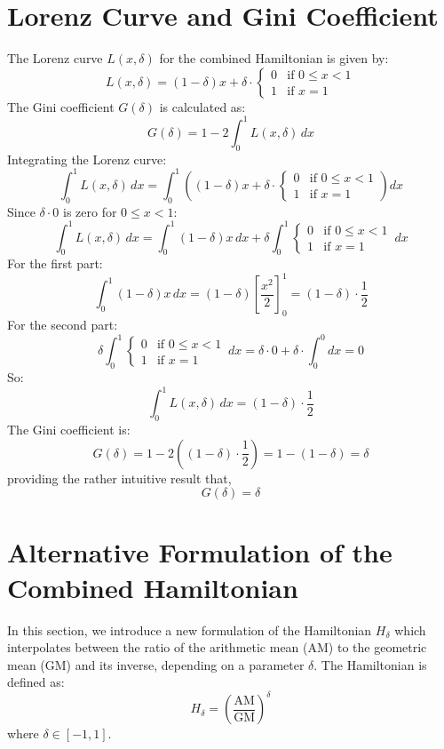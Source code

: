 \documentclass{article}
\begin{document}
\section{Lorenz Curve and Gini Coefficient}
The Lorenz curve \( L(x, \delta) \) for the combined Hamiltonian is given by:
\[
L(x, \delta) = (1 - \delta) x + \delta \cdot
\begin{cases} 
0 & \text{if } 0 \leq x < 1 \\
1 & \text{if } x = 1
\end{cases}
\]
The Gini coefficient \( G(\delta) \) is calculated as:
\[
G(\delta) = 1 - 2 \int_0^1 L(x, \delta) \, dx
\]
Integrating the Lorenz curve:
\[
\int_0^1 L(x, \delta) \, dx = \int_0^1 \left( (1 - \delta) x + \delta \cdot
\begin{cases} 
0 & \text{if } 0 \leq x < 1 \\
1 & \text{if } x = 1
\end{cases}
\right) dx
\]
Since \( \delta \cdot 0 \) is zero for \( 0 \leq x < 1 \):
\[
\int_0^1 L(x, \delta) \, dx = \int_0^1 (1 - \delta) x \, dx + \delta \int_0^1
\begin{cases} 
0 & \text{if } 0 \leq x < 1 \\
1 & \text{if } x = 1
\end{cases}
\, dx
\]
For the first part:
\[
\int_0^1 (1 - \delta) x \, dx = (1 - \delta) \left[ \frac{x^2}{2} \right]_0^1 = (1 - \delta) \cdot \frac{1}{2}
\]
For the second part:
\[
\delta \int_0^1
\begin{cases} 
0 & \text{if } 0 \leq x < 1 \\
1 & \text{if } x = 1
\end{cases}
\, dx = \delta \cdot 0 + \delta \cdot \int_{0}^{0} dx = 0
\]
So:
\[
\int_0^1 L(x, \delta) \, dx = (1 - \delta) \cdot \frac{1}{2}
\]
The Gini coefficient is:
\[
G(\delta) = 1 - 2 \left( (1 - \delta) \cdot \frac{1}{2} \right) = 1 - (1 - \delta) = \delta
\]
providing the rather intuitive result that,
\[G(\delta) = \delta\]

\section{Alternative Formulation of the Combined Hamiltonian}

In this section, we introduce a new formulation of the Hamiltonian \( H_\delta \) which interpolates between the ratio of the arithmetic mean (AM) to the geometric mean (GM) and its inverse, depending on a parameter \(\delta\). The Hamiltonian is defined as:
\[
H_\delta = \left( \frac{\text{AM}}{\text{GM}} \right)^\delta
\]
where \(\delta \in [-1, 1]\).
\end{document}
